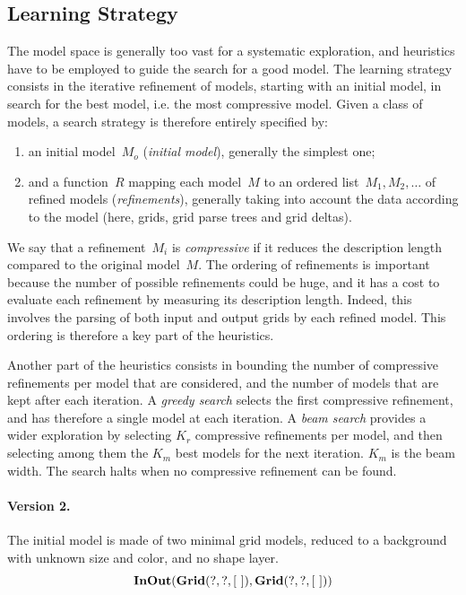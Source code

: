 \documentclass[a4paper]{llncs}
\begin{document}
\subsection{Learning Strategy}

The model space is generally too vast for a systematic exploration,
and heuristics have to be employed to guide the search for a good
model.
%
The learning strategy consists in the iterative refinement of models,
starting with an initial model, in search for the best model, i.e. the
most compressive model. Given a class of models, a search strategy is
therefore entirely specified by:
\begin{enumerate}
\item an initial model~$M_o$ ({\em initial model}), generally the
  simplest one;
\item and a function~$R$ mapping each model~$M$ to an ordered
  list~$M_1, M_2, \ldots$ of refined models ({\em refinements}),
  generally taking into account the data according to the model (here,
  grids, grid parse trees and grid deltas).
\end{enumerate}
We say that a refinement~$M_i$ is {\em compressive} if it reduces the
description length compared to the original model~$M$. The ordering of
refinements is important because the number of possible refinements
could be huge, and it has a cost to evaluate each refinement by
measuring its description length. Indeed, this involves the parsing of
both input and output grids by each refined model.  This ordering is
therefore a key part of the heuristics.

Another part of the heuristics consists in bounding the number of
compressive refinements per model that are considered, and the number
of models that are kept after each iteration. A {\em greedy search}
selects the first compressive refinement, and has therefore a single
model at each iteration. A {\em beam search} provides a wider
exploration by selecting $K_r$ compressive refinements per model, and
then selecting among them the $K_m$ best models for the next
iteration. $K_m$ is the beam width. The search halts when no
compressive refinement can be found.

\paragraph{Version 2.} The initial model is made of two minimal grid
models, reduced to a background with unknown size and color, and no
shape layer.
\[ {\bf InOut}({\bf Grid}(?,?,[\ ]), {\bf Grid}(?,?,[\ ])) \]
\end{document}
